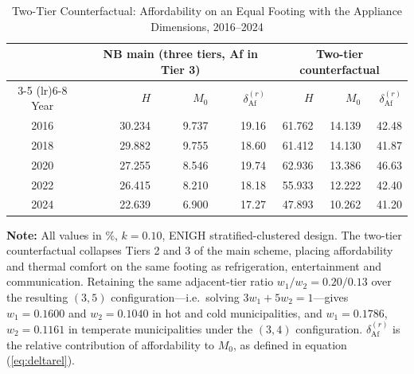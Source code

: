 \documentclass[11pt, a4paper]{article}
\begin{document}
\begin{table}[htb]
\centering
\caption{Two-Tier Counterfactual: Affordability on an Equal Footing with the Appliance Dimensions, 2016--2024}
\small
\begin{tabularx}{\textwidth}{c X rrr rrr}
\toprule
\toprule
& & \multicolumn{3}{c}{NB main (three tiers, Af in Tier 3)} & \multicolumn{3}{c}{Two-tier counterfactual} \\
\cmidrule(lr){3-5} \cmidrule(lr){6-8}
Year & & $H$ & $M_0$ & $\delta^{(r)}_{\mathrm{Af}}$ & $H$ & $M_0$ & $\delta^{(r)}_{\mathrm{Af}}$ \\ \midrule
2016 & & 30.234 & 9.737 & 19.16 & 61.762 & 14.139 & 42.48 \\
2018 & & 29.882 & 9.755 & 18.60 & 61.412 & 14.130 & 41.87 \\
2020 & & 27.255 & 8.546 & 19.74 & 62.936 & 13.386 & 46.63 \\
2022 & & 26.415 & 8.210 & 18.18 & 55.933 & 12.222 & 42.40 \\
2024 & & 22.639 & 6.900 & 17.27 & 47.893 & 10.262 & 41.20 \\
\bottomrule
\end{tabularx}
\begin{justify}
\scriptsize
\textbf{Note:} All values in \%, $k=0.10$, ENIGH stratified-clustered design. The two-tier counterfactual collapses Tiers 2 and 3 of the main scheme, placing affordability and thermal comfort on the same footing as refrigeration, entertainment and communication. Retaining the same adjacent-tier ratio $w_1/w_2 = 0.20/0.13$ over the resulting $(3,5)$ configuration---i.e.\ solving $3w_1 + 5w_2 = 1$---gives $w_1 = 0.1600$ and $w_2 = 0.1040$ in hot and cold municipalities, and $w_1 = 0.1786$, $w_2 = 0.1161$ in temperate municipalities under the $(3,4)$ configuration. $\delta^{(r)}_{\mathrm{Af}}$ is the relative contribution of affordability to $M_0$, as defined in equation (\ref{eq:deltarel}).
\smallskip


\end{justify}
\end{table}
\end{document}
